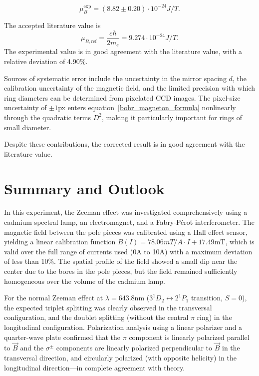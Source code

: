 \documentclass{article}
\begin{document}
\begin{equation}
   \mu_B^\mathrm{exp} = (8.82 \pm 0.20) \cdot 10^{-24}J/T.
\end{equation}

The accepted literature value is
\begin{equation}
    \mu_{B,\mathrm{ref}} = \frac{e\hbar}{2m_e} = 9.274 \cdot 10^{-24}J/T.
\end{equation}
The experimental value is in good agreement with the literature value, with a relative deviation of 4.90\%.

Sources of systematic error include the uncertainty in the mirror spacing $d$, the calibration uncertainty of the magnetic field, and the limited precision with which ring diameters can be determined from pixelated CCD images. 
The pixel-size uncertainty of $\pm 1$px enters equation~\eqref{bohr_magneton_formula} nonlinearly through the quadratic terms $D^2$, making it particularly important for rings of small diameter.

Despite these contributions, the corrected result is in good agreement with the literature value.

\section{Summary and Outlook}

In this experiment, the Zeeman effect was investigated comprehensively using a cadmium spectral lamp, an electromagnet, and a Fabry-Pérot interferometer. The magnetic field between the pole pieces was calibrated using a Hall effect sensor, yielding a linear calibration function $B(I) = 78.06mT/A \cdot I + 17.49$mT, which is valid over the full range of currents used (0A to 10A) with a maximum deviation of less than 10\%. The spatial profile of the field showed a small dip near the center due to the bores in the pole pieces, but the field remained sufficiently homogeneous over the volume of the cadmium lamp.

For the normal Zeeman effect at $\lambda = 643.8$nm ($3^1D_2 \leftrightarrow 2^1P_1$ transition, $S=0$), the expected triplet splitting was clearly observed in the transversal configuration, and the doublet splitting (without the central $\pi$ ring) in the longitudinal configuration. Polarization analysis using a linear polarizer and a quarter-wave plate confirmed that the $\pi$ component is linearly polarized parallel to $\vec{B}$ and the $\sigma^\pm$ components are linearly polarized perpendicular to $\vec{B}$ in the transversal direction, and circularly polarized (with opposite helicity) in the longitudinal direction—in complete agreement with theory.
\end{document}

